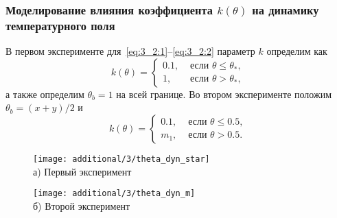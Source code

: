 \begin{frame}
    \frametitle{Моделирование влияния коэффициента $k(\theta)$ на динамику температурного поля}
    В первом эксперименте для~\eqref{eq:3_2:1}--\eqref{eq:3_2:2} параметр $k$ определим как
    \[
        k(\theta)=
        \begin{cases}
            0.1, & \text { если } \theta \leq \theta_{*}, \\
            1, & \text { если } \theta>\theta_{*},
        \end{cases}
    \]
    а также определим $\theta_b = 1$ на всей границе.
    Во втором эксперименте положим $\theta_b = (x + y) /2$ и
    \[
        k(\theta)=
        \begin{cases}
            0.1, & \text { если } \theta \leq 0.5, \\
            m_1, & \text { если } \theta > 0.5.
        \end{cases}
    \]
    \begin{figure}[h!t]
        \begin{minipage}[b][][b]{0.49\linewidth}
            \centering
            \texttt{[image: additional/3/theta\_dyn\_star]} \\ а) Первый эксперимент
        \end{minipage}
        \hfill
        \begin{minipage}[b][][b]{0.49\linewidth}
            \centering
            \texttt{[image: additional/3/theta\_dyn\_m]} \\ б) Второй эксперимент
        \end{minipage}\label{fig:figure~~}
    \end{figure}
\end{frame}
